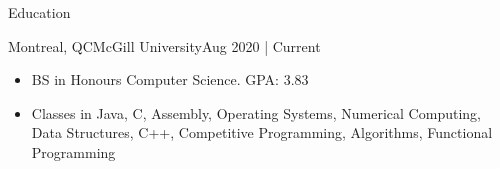 \documentclass[]{mcdowellcv}
\begin{document}
\makeheader

\begin{cvsection}{Education}
	\begin{cvsubsection}{Montreal, QC}{McGill University}{Aug 2020 | Current}
	\vspace{-1.5mm}
		\begin{itemize}
			\item BS in Honours Computer Science. GPA: 3.83
			\item Classes in Java, C, Assembly, Operating Systems, Numerical Computing, Data Structures, C++, Competitive Programming, Algorithms, Functional Programming
		\end{itemize}
	\vspace{-1.5mm}
	\end{cvsubsection}
\end{cvsection}
\end{document}
